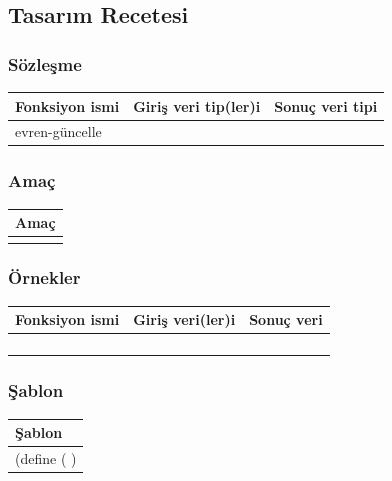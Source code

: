 \documentclass[12pt, a4paper]{article}
\newcommand\fillin[1][3cm]{\makebox[#1]{\dotfill}}
\begin{document}




\newpage
\subsection*{Tasarım Recetesi}
\subsubsection*{Sözleşme}
\begin{tabular}{| p{4cm} | p{8cm} | p{4cm} |  }
\hline			
Fonksiyon ismi&Giriş veri tip(ler)i&Sonuç veri tipi\\
\hline
evren-güncelle& & \\[10ex]
\hline  
\end{tabular}

\subsubsection*{Amaç}
\begin{tabular}{| p{17cm} |  }
\hline			
Amaç\\
\hline
 \\[10ex]
\hline  
\end{tabular}

\subsubsection*{Örnekler}
\begin{tabular}{| p{4cm} | p{8cm} | p{4cm} |  }
\hline			
Fonksiyon ismi&Giriş veri(ler)i&Sonuç veri\\
\hline
& & \\[6ex]
\hline  
& & \\[6ex]
\hline  
& & \\[6ex]
\hline  
& & \\[6ex]
\hline  
\end{tabular}

\subsubsection*{Şablon}
\begin{tabular}{| p{17cm} |  }
\hline			
Şablon\\
\hline
\vspace{0,2cm}
(define (\fillin[2cm] \hspace{1cm}  \fillin[8cm] ) \\[30ex]
\hline  
\end{tabular}
\end{document}
